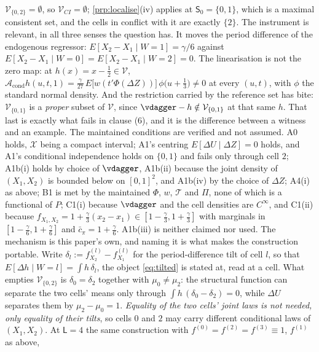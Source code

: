 \begin{remark}
\begin{enumerate}
$\mathcal V_{\{0,2\}}=\emptyset$, so $\mathcal V_{CI}=\emptyset$;
\cref{prp:localise}\textup{(iv)} applies at $\mathsf S_0=\{0,1\}$, which is a maximal consistent set, and
the cells in conflict with it are exactly $\{2\}$.
The instrument is relevant, in all three senses the question has. It moves the period difference
of the endogenous regressor: $E[X_2-X_1\mid W=1]=\gamma/6$ against
$E[X_2-X_1\mid W=0]=E[X_2-X_1\mid W=2]=0$. The linearisation is not the zero map: at
$h(x)=x-\tfrac12\in\mathcal V$,
$\mathcal A_{\mathrm{cond}}h(u,t,1)=\tfrac{\gamma}{27}\,E\big[w(t'\Phi(\Delta Z))\big]\,\phi\big(u+\tfrac13\big)\neq0$
at every $(u,t)$, with $\phi$ the standard normal density. And the restriction carried by the reference
set has bite: $\mathcal V_{\{0,1\}}$ is a \emph{proper} subset of $\mathcal V$, since
$\vdagger-h\notin\mathcal V_{\{0,1\}}$ at that same $h$. That last is exactly what fails in clause
\textup{(6)}, and it is the difference between a witness and an example.
The maintained conditions are verified and not assumed. A0 holds, $\mathcal X$ being a compact
interval; A1's centring $E[\Delta U\mid\Delta Z]=0$ holds, and A1's conditional independence holds on
$\{0,1\}$ and fails only through cell $2$; A1b(i) holds by choice of $\vdagger$, A1b(ii) because the
joint density of $(X_1,X_2)$ is bounded below on $[0,1]^{2}$, and A1b(iv) by the choice of $\Delta Z$;
A4(i) as above; B1 is met by the maintained $\Phi$, $w$, $\mathcal T$ and $\Pi$, none of which is a
functional of $P$; C1(i) because $\vdagger$ and the cell densities are $C^{\infty}$, and C1(ii) because
$f_{X_1,X_2}=1+\tfrac{\gamma}{3}(x_2-x_1)\in[1-\tfrac{\gamma}{3},1+\tfrac{\gamma}{3}]$ with marginals in
$[1-\tfrac{\gamma}{6},1+\tfrac{\gamma}{6}]$ and $\bar c_\pi=1+\tfrac{\gamma}{6}$. A1b(iii) is
neither claimed nor used.
The mechanism is this paper's own, and naming it is what makes the construction portable. Write
$\delta_l:=f^{(l)}_{X_2}-f^{(l)}_{X_1}$ for the period-difference tilt of cell $l$, so that
$E[\Delta h\mid W=l]=\int h\,\delta_l$, the object \eqref{eq:tilted} is stated at, read at a cell. What
empties $\mathcal V_{\{0,2\}}$ is $\delta_0=\delta_2$ together with $\mu_0\neq\mu_2$: the structural
function can separate the two cells' means only through $\int h\,(\delta_0-\delta_2)=0$, while
$\Delta U$ separates them by $\mu_2-\mu_0=1$. \emph{Equality of the two cells' joint laws is not needed,
only equality of their tilts}, so cells $0$ and $2$ may carry different conditional laws of $(X_1,X_2)$.
At $\mathsf L=4$ the same construction with $f^{(0)}=f^{(2)}=f^{(3)}\equiv1$, $f^{(1)}$ as above,

\end{enumerate}
\end{remark}
